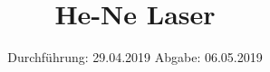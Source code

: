 

\subject{61}
\title{He-Ne Laser}
\date{%
  Durchführung: 29.04.2019
  \hspace{3em}
  Abgabe: 06.05.2019
}



\maketitle
\thispagestyle{empty}
\tableofcontents
\newpage






\printbibliography{}


